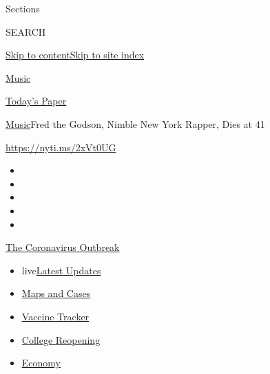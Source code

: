 Sections

SEARCH

\protect\hyperlink{site-content}{Skip to
content}\protect\hyperlink{site-index}{Skip to site index}

\href{https://www.nytimes.com/section/arts/music}{Music}

\href{https://myaccount.nytimes.com/auth/login?response_type=cookie\&client_id=vi}{}

\href{https://www.nytimes.com/section/todayspaper}{Today's Paper}

\href{/section/arts/music}{Music}\textbar{}Fred the Godson, Nimble New
York Rapper, Dies at 41

\url{https://nyti.ms/2xVt0UG}

\begin{itemize}
\item
\item
\item
\item
\item
\end{itemize}

\href{https://www.nytimes.com/news-event/coronavirus?action=click\&pgtype=Article\&state=default\&region=TOP_BANNER\&context=storylines_menu}{The
Coronavirus Outbreak}

\begin{itemize}
\tightlist
\item
  live\href{https://www.nytimes.com/2020/08/03/world/coronavirus-covid-19.html?action=click\&pgtype=Article\&state=default\&region=TOP_BANNER\&context=storylines_menu}{Latest
  Updates}
\item
  \href{https://www.nytimes.com/interactive/2020/us/coronavirus-us-cases.html?action=click\&pgtype=Article\&state=default\&region=TOP_BANNER\&context=storylines_menu}{Maps
  and Cases}
\item
  \href{https://www.nytimes.com/interactive/2020/science/coronavirus-vaccine-tracker.html?action=click\&pgtype=Article\&state=default\&region=TOP_BANNER\&context=storylines_menu}{Vaccine
  Tracker}
\item
  \href{https://www.nytimes.com/2020/08/02/us/covid-college-reopening.html?action=click\&pgtype=Article\&state=default\&region=TOP_BANNER\&context=storylines_menu}{College
  Reopening}
\item
  \href{https://www.nytimes.com/live/2020/08/03/business/stock-market-today-coronavirus?action=click\&pgtype=Article\&state=default\&region=TOP_BANNER\&context=storylines_menu}{Economy}
\end{itemize}


